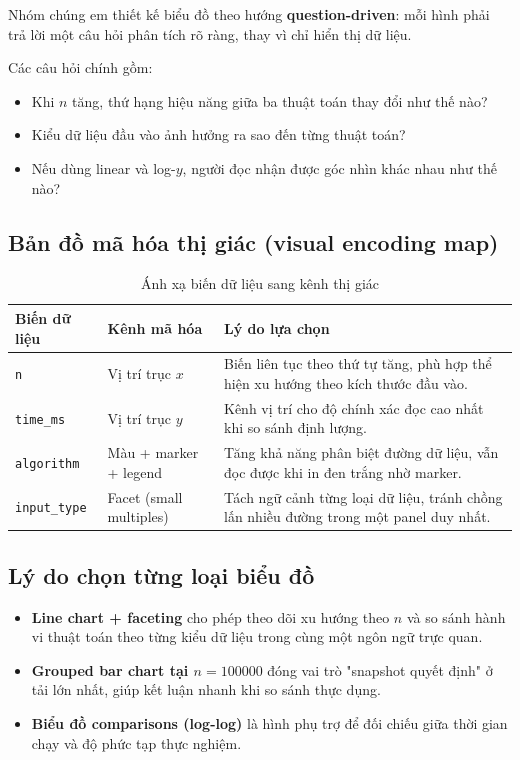 Nhóm chúng em thiết kế biểu đồ theo hướng
\textbf{question-driven}: mỗi hình phải trả lời một câu hỏi phân tích rõ ràng, thay vì chỉ hiển thị dữ liệu.

Các câu hỏi chính gồm:
\begin{itemize}[leftmargin=1.2cm]
    \item Khi $n$ tăng, thứ hạng hiệu năng giữa ba thuật toán thay đổi như thế nào?
    \item Kiểu dữ liệu đầu vào ảnh hưởng ra sao đến từng thuật toán?
    \item Nếu dùng linear và log-$y$, người đọc nhận được góc nhìn khác nhau như thế nào?
\end{itemize}

\subsection{Bản đồ mã hóa thị giác (visual encoding map)}

\begin{table}[H]
\centering
\renewcommand{\arraystretch}{1.2}
\begin{tabular}{p{3.0cm}p{3.0cm}p{7.6cm}}
\toprule
\textbf{Biến dữ liệu} & \textbf{Kênh mã hóa} & \textbf{Lý do lựa chọn} \\
\midrule
\texttt{n} & Vị trí trục $x$ & Biến liên tục theo thứ tự tăng, phù hợp thể hiện xu hướng theo kích thước đầu vào. \\
\texttt{time\_ms} & Vị trí trục $y$ & Kênh vị trí cho độ chính xác đọc cao nhất khi so sánh định lượng. \\
\texttt{algorithm} & Màu + marker + legend & Tăng khả năng phân biệt đường dữ liệu, vẫn đọc được khi in đen trắng nhờ marker. \\
\texttt{input\_type} & Facet (small multiples) & Tách ngữ cảnh từng loại dữ liệu, tránh chồng lấn nhiều đường trong một panel duy nhất. \\
\bottomrule
\end{tabular}
\caption{Ánh xạ biến dữ liệu sang kênh thị giác}
\label{tab:visual-encoding-map}
\end{table}

\subsection{Lý do chọn từng loại biểu đồ}

\begin{itemize}[leftmargin=1.2cm]
    \item \textbf{Line chart + faceting} cho phép theo dõi xu hướng theo $n$ và so sánh hành vi thuật toán theo từng kiểu dữ liệu trong cùng một ngôn ngữ trực quan.
    \item \textbf{Grouped bar chart tại $n=100000$} đóng vai trò "snapshot quyết định" ở tải lớn nhất, giúp kết luận nhanh khi so sánh thực dụng.
    \item \textbf{Biểu đồ comparisons (log-log)} là hình phụ trợ để đối chiếu giữa thời gian chạy và độ phức tạp thực nghiệm.
\end{itemize}

